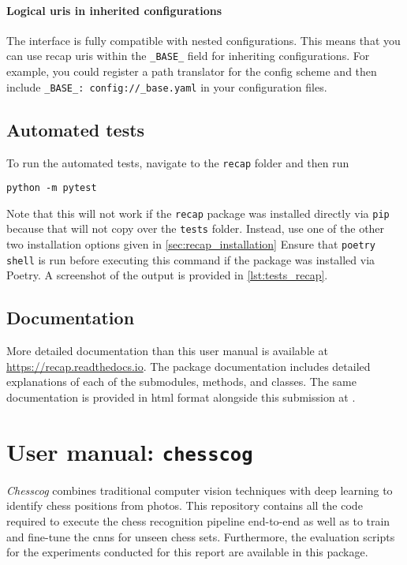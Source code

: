 \documentclass[../../report.tex]{subfiles}
\begin{document}
\subsubsection{Logical \acsp{uri} in inherited configurations}
The  interface is fully compatible with nested configurations.
This means that you can use recap \glspl{uri} within the \texttt{_BASE_} field for inheriting configurations.
For example, you could register a path translator for the config scheme and then include \texttt{_BASE_: config://_base.yaml} in your configuration files.

\section{Automated tests}
\label{sec:recap_tests}
To run the automated tests, navigate to the \texttt{recap} folder and then run
\begin{verbatim}
python -m pytest
\end{verbatim}
Note that this will not work if the \texttt{recap} package was installed directly via \texttt{pip} because that will not copy over the \texttt{tests} folder.
Instead, use one of the other two installation options given in \cref{sec:recap_installation}
Ensure that \texttt{poetry shell} is run before executing this command if the package was installed via Poetry.
A screenshot of the output is provided in \cref{lst:tests_recap}.

\section{Documentation}
\label{sec:recap_documentation}
More detailed documentation than this user manual is available at \url{https://recap.readthedocs.io}.
The package documentation includes detailed explanations of each of the submodules, methods, and classes.
The same documentation is provided in \gls{html} format alongside this submission at .

\chapter{User manual: \texttt{chesscog}}
\label{chap:user_man_chesscog}

\emph{Chesscog} combines traditional computer vision techniques with deep learning to identify chess positions from photos.
This repository contains all the code required to execute the chess recognition pipeline end-to-end as well as to train and fine-tune the \glspl{cnn} for unseen chess sets.
Furthermore, the evaluation scripts for the experiments conducted for this report are available in this package.
\end{document}
